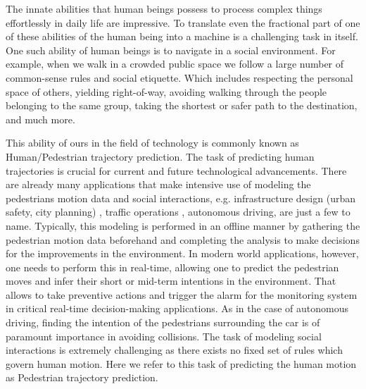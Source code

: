 The innate abilities that human beings possess to process complex things effortlessly in daily life are impressive. To translate even the fractional part of one of these abilities of the human being into a machine is a challenging task in itself. One such ability of human beings is to navigate in a social environment. For example, when we walk in a crowded public space we follow a large number of common-sense rules and social etiquette. Which includes respecting the personal space of others, yielding right-of-way, avoiding walking through the people belonging to the same group, taking the shortest or safer path to the destination, and much more.

This ability of ours in the field of technology is commonly known as Human/Pedestrian trajectory prediction. The task of predicting human trajectories is crucial for current and future technological advancements. There are already many applications that make intensive use of modeling the pedestrians motion data and social interactions, e.g. infrastructure design (urban safety, city planning) \cite{Hanisch2003OnlineSO, Lerner2007CrowdsBE, Bitgood2006AnAO}, traffic operations \cite{Horni2016TheMT}, autonomous driving, are just a few to name. Typically, this modeling is performed in an offline manner by gathering the pedestrian motion data beforehand and completing the analysis to make decisions for the improvements in the environment. In modern world applications, however, one needs to perform this in real-time, allowing one to predict the pedestrian moves and infer their short or mid-term intentions in the environment. That allows to take preventive actions and trigger the alarm for the monitoring system in critical real-time decision-making applications. As in the case of autonomous driving, finding the intention of the pedestrians surrounding the car is of paramount importance in avoiding collisions. The task of modeling social interactions is extremely challenging as there exists no fixed set of rules which govern human motion. Here we refer to this task of predicting the human motion as Pedestrian trajectory prediction.


